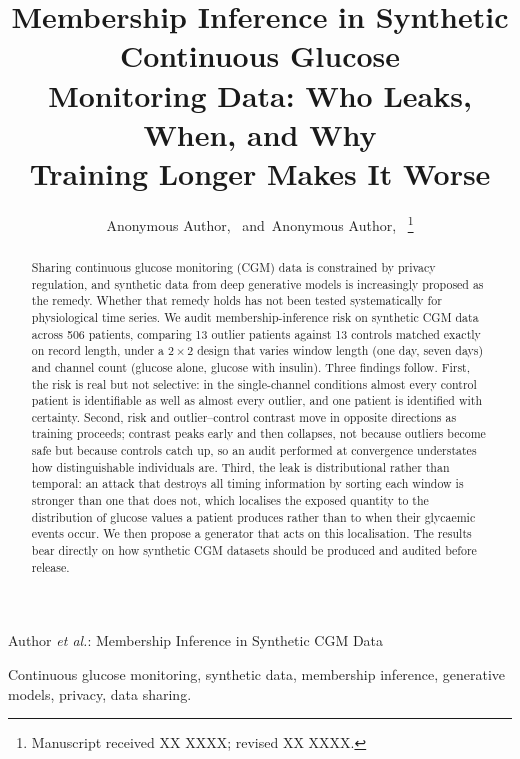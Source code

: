 \documentclass[journal]{IEEEtran}
\begin{document}
\title{Membership Inference in Synthetic Continuous Glucose\\
Monitoring Data: Who Leaks, When, and Why\\
Training Longer Makes It Worse}

\author{Anonymous Author,~
        and~Anonymous Author,~%
\thanks{Manuscript received XX XXXX; revised XX XXXX.}}

%
{Author \MakeLowercase{\textit{et al.}}: Membership Inference in Synthetic CGM Data}

\maketitle

\begin{abstract}
Sharing continuous glucose monitoring (CGM) data is constrained by privacy regulation,
and synthetic data from deep generative models is increasingly proposed as the remedy.
Whether that remedy holds has not been tested systematically for physiological time
series. We audit membership-inference risk on synthetic CGM data across 506 patients,
comparing 13 outlier patients against 13 controls matched exactly on record length,
under a $2\times2$ design that varies window length (one day, seven days) and channel
count (glucose alone, glucose with insulin). Three findings follow. First, the risk is
real but not selective: in the single-channel conditions almost every control patient is
identifiable as well as almost every outlier, and one patient is identified with
certainty. Second, risk and outlier--control contrast move in opposite directions as
training proceeds; contrast peaks early and then collapses, not because outliers become
safe but because controls catch up, so an audit performed at convergence understates how
distinguishable individuals are. Third, the leak is distributional rather than temporal:
an attack that destroys all timing information by sorting each window is stronger than
one that does not, which localises the exposed quantity to the distribution of glucose
values a patient produces rather than to when their glycaemic events occur. We then
propose a generator that acts on this localisation. The results bear directly on how
synthetic CGM datasets should be produced and audited before release.
\end{abstract}

\begin{IEEEkeywords}
Continuous glucose monitoring, synthetic data, membership inference, generative models,
privacy, data sharing.
\end{IEEEkeywords}
\end{document}

